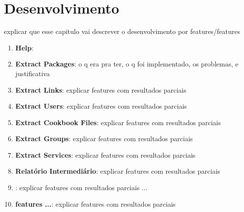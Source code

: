 \newpage\null\thispagestyle{empty}\newpage
\chapter{Desenvolvimento}
\label{chap:dev}

{\color{red} explicar que esse capitulo vai descrever o desenvolvimento por 
features/features}


\begin{enumerate}
  \item \textbf{Help}:
  \item \textbf{Extract Packages}: {\color{red} o q era pra ter, o q foi implementado, os problemas, e justificativa }
  \item \textbf{Extract Links}:{\color{red} explicar features com resultados parciais}
  \item \textbf{Extract Users}:{\color{red} explicar features com resultados parciais}
  \item \textbf{Extract Cookbook Files}:{\color{red} explicar features com resultados parciais}
  \item \textbf{Extract Groups}:{\color{red} explicar features com resultados parciais}
  \item \textbf{Extract Services}:{\color{red} explicar features com resultados parciais}
  \item \textbf{Relatório Intermediário}:{\color{red} explicar features com resultados parciais}
  \item \textbf{}:{\color{red} explicar features com resultados parciais}
  {\color{red} ...}
  \item \textbf{features ...}:{\color{red} explicar features com resultados parciais}
\end{enumerate}

%
